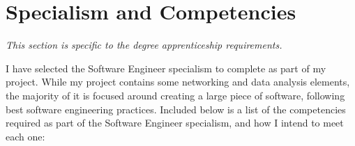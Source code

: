 \documentclass[12pt]{article}
\begin{document}
	\section{Specialism and Competencies}
	\small{\textit{This section is specific to the degree apprenticeship requirements.}} \medskip
	
	I have selected the Software Engineer specialism to complete as part of my project. While my project contains some networking and data analysis elements, the majority of it is focused around creating a large piece of software, following best software engineering practices.
	Included below is a list of the competencies required as part of the Software Engineer specialism, and how I intend to meet each one:
	
	
\end{document}

